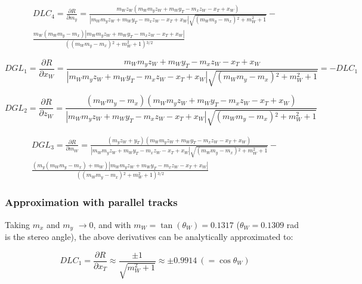 \documentclass[a4paper,11pt]{article}
\begin{document}
\begin{equation}
\begin{split}
DLC_4 = \frac{ \partial R}{\partial m_y} = \frac{m_W z_W(m_W m_y z_W+m_W y_T-m_x z_W-x_T+x_W)}{|m_W m_y z_W+m_W y_T-m_x z_W-x_T+x_W|\sqrt{\left(m_W m_y-m_x\right){}^2+m_W^2+1}}-\\
\frac{m_W \left(m_W m_y-m_x\right) |m_W m_y z_W+m_W y_T-m_x z_W-x_T+x_W|}{\left(\left(m_W m_y-m_x\right){}^2+m_W^2+1\right){}^{3/2}}
\end{split}
\end{equation}


\begin{equation}	
DGL_1 = \frac{\partial R}{\partial x_W} = \frac{m_W m_y z_W+m_W y_T-m_x z_W-x_T+x_W}{|m_W m_y z_W+m_W y_T-m_x z_W-x_T+x_W|\sqrt{\left(m_W m_y-m_x\right){}^2+m_W^2+1}} = - DLC_1
\end{equation}

\begin{equation}	
DGL_2 = \frac{\partial R}{\partial z_W} = \frac{(m_W m_y-m_x) (m_W m_y z_W+m_W y_T-m_x z_W-x_T+x_W)}{|m_W m_y z_W+m_W y_T-m_x z_W-x_T+x_W|\sqrt{\left(m_W m_y-m_x\right){}^2+m_W^2+1}}
\end{equation}

\begin{equation}
\begin{split}	
DGL_3 = \frac{\partial R}{\partial m_W} = \frac{(m_y z_W+y_T)(m_W m_y z_W+m_W y_T-m_x z_W-x_T+x_W)}{|m_W m_y z_W+m_W y_T-m_x z_W-x_T+x_W|\sqrt{\left(m_W m_y-m_x\right){}^2+m_W^2+1}}-\\
\frac{\left(m_y \left(m_W m_y-m_x\right)+ m_W\right) |m_W m_y z_W+m_W y_T-m_x z_W-x_T+x_W|}{ \left(\left(m_W m_y-m_x\right){}^2+m_W^2+1\right){}^{3/2}}
\end{split}
\end{equation}

\subsubsection{Approximation with parallel tracks}

Taking $m_x$ and $m_y$ $\rightarrow 0$, and with $m_W = \tan(\theta_W)=0.1317$ ($\theta_W = 0.1309$ rad is the stereo angle), the above derivatives can be analytically approximated to:

\begin{equation}
DLC_1 = \frac{\partial R}{\partial x_T} \approx   \frac{\pm1}{\sqrt{m_W^2+1}} \approx \pm 0.9914 \ (= \cos\theta_W)
\end{equation}
\end{document}
